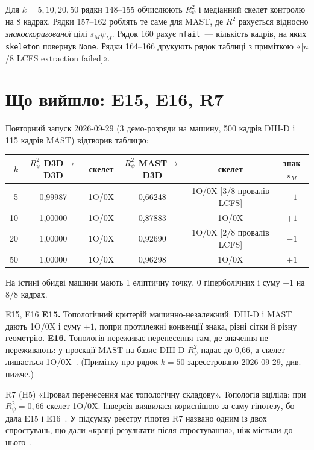 
Для $k=5,10,20,50$ рядки 148--155 обчислюють $R^2_\psi$ і медіанний скелет контролю на 8 кадрах. Рядки 157--162 роблять те саме для MAST, де $R^2$ рахується відносно \emph{знакоскоригованої} цілі $s_M\psi_M$. Рядок 160 рахує \texttt{nfail}~--- кількість кадрів, на яких \texttt{skeleton} повернув \texttt{None}. Рядки 164--166 друкують рядок таблиці з приміткою «[$n$/8 LCFS extraction failed]».

\section{Що вийшло: E15, E16, R7}\label{sec:g06-results}

Повторний запуск 2026-09-29 (3 демо-розряди на машину, 500 кадрів DIII-D і 115 кадрів MAST) відтворив таблицю:

\begin{center}\small
\begin{tabular}{r|cc|ccc}
\toprule
$k$ & $R^2_\psi$ D3D$\to$D3D & скелет & $R^2_\psi$ MAST$\to$D3D & скелет & знак $s_M$\\
\midrule
5  & 0,99987 & 1O/0X & 0,66248 & 1O/0X [3/8 провалів LCFS] & $-1$\\
10 & 1,00000 & 1O/0X & 0,87883 & 1O/0X & $+1$\\
20 & 1,00000 & 1O/0X & 0,92690 & 1O/0X [2/8 провалів LCFS] & $-1$\\
50 & 1,00000 & 1O/0X & 0,96298 & 1O/0X & $+1$\\
\bottomrule
\end{tabular}
\end{center}

\noindent На істині обидві машини мають 1 еліптичну точку, 0 гіперболічних і суму $+1$ на 8/8 кадрах.

\begin{established}{E15, E16}
\textbf{E15.} Топологічний критерій машинно-незалежний: DIII-D і MAST дають 1O/0X і суму $+1$, попри протилежні конвенції знака, різні сітки й різну геометрію.
\textbf{E16.} Топологія переживає перенесення там, де значення не переживають: у проєкції MAST на базис DIII-D $R^2_\psi$ падає до 0,66, а скелет лишається 1O/0X~\cite{RegEst}. (Примітку про рядок $k=50$ зареєстровано 2026-09-29, див. нижче.)
\end{established}

\begin{refuted}{R7 (H5)}
«Провал перенесення має топологічну складову». Топологія вціліла: при $R^2_\psi=0{,}66$ скелет 1O/0X. Інверсія виявилася кориснішою за саму гіпотезу, бо дала E15 і E16~\cite{RegEst}. У підсумку реєстру гіпотез R7 названо одним із двох спростувань, що дали «кращі результати після спростування», ніж містили до нього~\cite{RegConj}.
\end{refuted}

